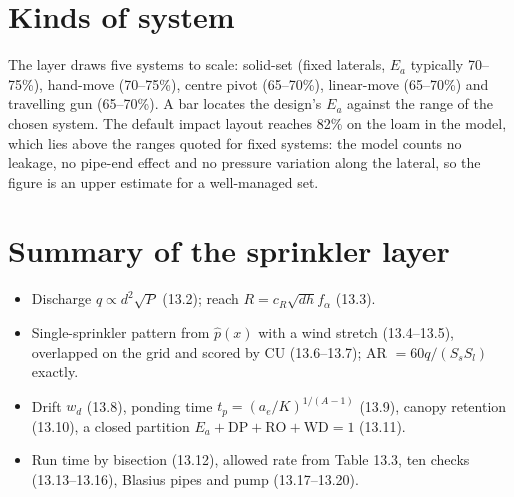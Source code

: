 \section{Kinds of system}
The layer draws five systems to scale: solid-set (fixed laterals, $E_a$ typically 70--75\%), hand-move (70--75\%), centre pivot (65--70\%), linear-move (65--70\%) and travelling gun (65--70\%). A bar locates the design's $E_a$ against the range of the chosen system. The default impact layout reaches 82\% on the loam in the model, which lies above the ranges quoted for fixed systems: the model counts no leakage, no pipe-end effect and no pressure variation along the lateral, so the figure is an upper estimate for a well-managed set.

\section{Summary of the sprinkler layer}
\begin{itemize}
\item Discharge $q\propto d^2\sqrt P$ (13.2); reach $R=c_R\sqrt{dh}f_\alpha$ (13.3).
\item Single-sprinkler pattern from $\hat p(x)$ with a wind stretch (13.4--13.5), overlapped on the grid and scored by CU (13.6--13.7); AR $=60q/(S_sS_l)$ exactly.
\item Drift $w_d$ (13.8), ponding time $t_p=(a_e/K)^{1/(A-1)}$ (13.9), canopy retention (13.10), a closed partition $E_a+\mathrm{DP}+\mathrm{RO}+\mathrm{WD}=1$ (13.11).
\item Run time by bisection (13.12), allowed rate from Table 13.3, ten checks (13.13--13.16), Blasius pipes and pump (13.17--13.20).
\end{itemize}
